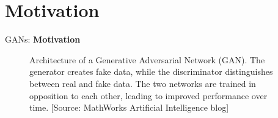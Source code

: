 \section{Motivation}
\begin{frame}{}
    \LARGE GANs: \textbf{Motivation}
\end{frame}

\begin{frame}{}
    \begin{figure}
        \centering
        \caption*{Architecture of a Generative Adversarial Network (GAN). The generator creates fake data, while the discriminator distinguishes between real and fake data. The two networks are trained in opposition to each other, leading to improved performance over time. {\scriptsize [Source: MathWorks Artificial Intelligence blog]}}
    \end{figure}
\end{frame}

